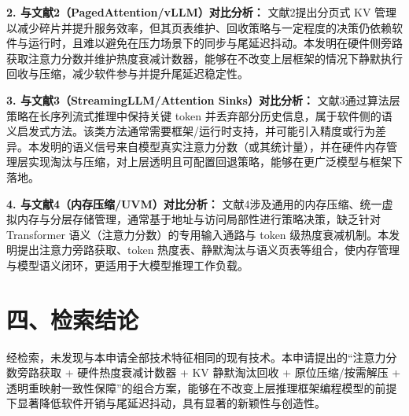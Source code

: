 \documentclass[12pt,a4paper]{article}
\begin{document}
\textbf{2. 与文献2（PagedAttention/vLLM）对比分析：}
文献2提出分页式 KV 管理以减少碎片并提升服务效率，但其页表维护、回收策略与一定程度的决策仍依赖软件与运行时，且难以避免在压力场景下的同步与尾延迟抖动。本发明在硬件侧旁路获取注意力分数并维护热度衰减计数器，能够在不改变上层框架的情况下静默执行回收与压缩，减少软件参与并提升尾延迟稳定性。

\textbf{3. 与文献3（StreamingLLM/Attention Sinks）对比分析：}
文献3通过算法层策略在长序列流式推理中保持关键 token 并丢弃部分历史信息，属于软件侧的语义启发式方法。该类方法通常需要框架/运行时支持，并可能引入精度或行为差异。本发明的语义信号来自模型真实注意力分数（或其统计量），并在硬件内存管理层实现淘汰与压缩，对上层透明且可配置回退策略，能够在更广泛模型与框架下落地。

\textbf{4. 与文献4（内存压缩/UVM）对比分析：}
文献4涉及通用的内存压缩、统一虚拟内存与分层存储管理，通常基于地址与访问局部性进行策略决策，缺乏针对 Transformer 语义（注意力分数）的专用输入通路与 token 级热度衰减机制。本发明提出注意力旁路获取、token 热度表、静默淘汰与语义页表等组合，使内存管理与模型语义闭环，更适用于大模型推理工作负载。

\section*{四、检索结论}

经检索，未发现与本申请全部技术特征相同的现有技术。本申请提出的“注意力分数旁路获取 + 硬件热度衰减计数器 + KV 静默淘汰回收 + 原位压缩/按需解压 + 透明重映射一致性保障”的组合方案，能够在不改变上层推理框架编程模型的前提下显著降低软件开销与尾延迟抖动，具有显著的新颖性与创造性。
\end{document}
